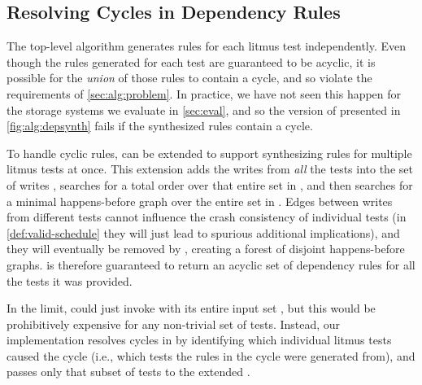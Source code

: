 \subsection{Resolving Cycles in Dependency Rules}\label{sec:alg:cycles}


The top-level \depsynthalg algorithm generates rules for each litmus test independently.
Even though the rules generated for each test are guaranteed to be acyclic,
it is possible for the \emph{union} of those rules to contain a cycle,
and so violate the requirements of \cref{sec:alg:problem}.
In practice, we have not seen this happen for the storage systems we evaluate in \cref{sec:eval},
and so the version of \depsynthalg presented in \cref{fig:alg:depsynth} fails if the synthesized rules contain a cycle.

To handle cyclic rules,
 can be extended to support synthesizing rules for multiple litmus tests at once.
This extension adds the writes from \emph{all} the tests into the set of writes \wr,
searches for a total order over that entire set in \phaseone,
and then searches for a minimal happens-before graph over the entire set in \phasetwo.
Edges between writes from different tests
cannot influence the crash consistency of individual tests
(in \cref{def:valid-schedule} they will just lead to spurious additional implications),
and they will eventually be removed by \phasetwo,
creating a forest of disjoint happens-before graphs.
\phasetwo is therefore guaranteed to return an acyclic set of dependency rules
for all the tests it was provided.

In the limit, \depsynthalg could just invoke  with its entire input set \tests,
but this would be prohibitively expensive for any non-trivial set of tests.
Instead, our implementation resolves cycles in \depsynthalg
by identifying which individual litmus tests caused the cycle
(i.e., which tests the rules in the cycle were generated from),
and passes only that subset of tests to the extended .
